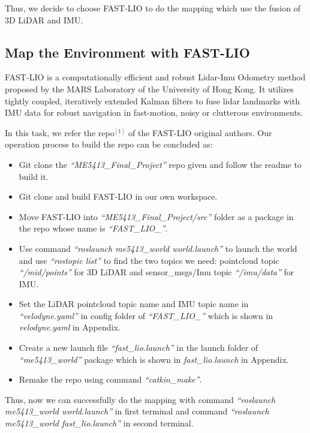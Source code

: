 \documentclass[hyperref]{article}
\theoremstyle{nonumberplain}
\begin{document}
Thus, we decide to choose FAST-LIO to do the mapping which use the fusion of 3D LiDAR and IMU.

\subsection{Map the Environment with FAST-LIO}
\hspace{1.0em}
FAST-LIO is a computationally efficient and robust Lidar-Imu Odometry method proposed by the MARS Laboratory of the University of Hong Kong. It utilizes tightly coupled, iteratively extended Kalman filters to fuse lidar landmarks with IMU data for robust navigation in fast-motion, noisy or clutterous environments.

In this task, we refer the repo$^{[1]}$ of the FAST-LIO original authors. Our operation process to build the repo can be concluded as:

\begin{itemize}[itemsep=3pt,topsep=0pt,parsep=0pt]
	\item Git clone the \textit{“ME5413\_Final\_Project”} repo given and follow the readme to build it.
	\item Git clone and build FAST-LIO in our own workspace.
	\item Move FAST-LIO into \textit{“ME5413\_Final\_Project/src”} folder as a package in the repo whose name is \textit{“FAST\_LIO\_”}.
	\item Use command \textit{“roslaunch me5413\_world world.launch”} to launch the world and use \textit{“rostopic list”} to find the two topics we need: pointcloud topic \textit{“/mid/points”} for 3D LiDAR and sensor\_msgs/Imu topic \textit{“/imu/data”} for IMU.
	\item Set the LiDAR pointcloud topic name and IMU topic name in \textit{“velodyne.yaml”} in config folder of \textit{“FAST\_LIO\_”} which is shown in \textit{velodyne.yaml} in Appendix.
	\item Create a new launch file \textit{“fast\_lio.launch”} in the launch folder of \textit{“me5413\_world”} package which is shown in \textit{fast\_lio.launch} in Appendix.
	\item Remake the repo using command \textit{“catkin\_make”}.
\end{itemize}

Thus, now we can successfully do the mapping with command \textit{“roslaunch me5413\_world world.launch”} in first terminal and command \textit{“roslaunch me5413\_world fast\_lio.launch”} in second terminal.
\end{document}
